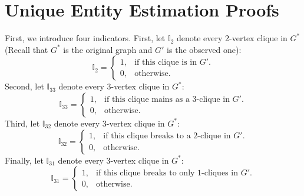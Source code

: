 \documentclass[aoas]{imsart}
\begin{document}
\section{Unique Entity Estimation Proofs}
\label{sec:app}
First, we introduce four indicators.
%
First, let $\mathbb{I}_2$ denote every 2-vertex clique in $G^*$ (Recall that $G^*$ is the original graph and $G'$ is the observed one):
	\begin{equation}
	\mathbb{I}_2=\begin{cases}
	1, & \text{if this clique is in } G'.\\
	0, & \text{otherwise}.
	\end{cases}
	\end{equation}
Second, let 	
$\mathbb{I}_{33}$ denote every 3-vertex clique in $G^*$:
	\begin{equation}
	\mathbb{I}_{33}=\begin{cases}
	1, & \text{if this clique mains as a 3-clique in } G'.\\
	0, & \text{otherwise}.
	\end{cases}
	\end{equation}
Third, let
$\mathbb{I}_{32}$ denote every 3-vertex clique in $G^*$:
	\begin{equation}
	\mathbb{I}_{32}=\begin{cases}
	1, & \text{if this clique breaks to a 2-clique in } G'.\\
	0, & \text{otherwise}.
	\end{cases}
	\end{equation}
Finally, let
$\mathbb{I}_{31}$ denote every 3-vertex clique in $G^*$:
	\begin{equation}
	\mathbb{I}_{31}=\begin{cases}
	1, & \text{if this clique breaks to only 1-cliques in } G'.\\
	0, & \text{otherwise}.
	\end{cases}
	\end{equation}
	
\end{document}

